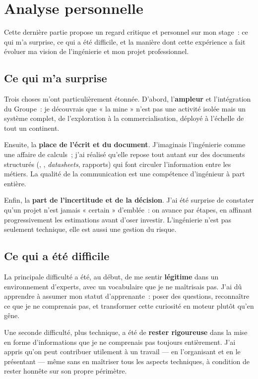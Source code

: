 \chapter{Analyse personnelle}
\label{chap:analyse}

Cette dernière partie propose un regard critique et personnel sur mon stage~: ce qui m'a surprise, ce qui a été difficile, et la manière dont cette expérience a fait évoluer ma vision de l'ingénierie et mon projet professionnel.

\section{Ce qui m'a surprise}

Trois choses m'ont particulièrement étonnée. D'abord, l'\textbf{ampleur} et l'intégration du Groupe~: je découvrais que « la mine » n'est pas une activité isolée mais un système complet, de l'exploration à la commercialisation, déployé à l'échelle de tout un continent.

Ensuite, la \textbf{place de l'écrit et du document}. J'imaginais l'ingénierie comme une affaire de calculs~; j'ai réalisé qu'elle repose tout autant sur des documents structurés (, , \textit{datasheets}, rapports) qui font circuler l'information entre les métiers. La qualité de la communication est une compétence d'ingénieur à part entière.

Enfin, la \textbf{part de l'incertitude et de la décision}. J'ai été surprise de constater qu'un projet n'est jamais « certain » d'emblée~: on avance par étapes, en affinant progressivement les estimations avant d'oser investir. L'ingénierie n'est pas seulement technique, elle est aussi une gestion du risque.

\section{Ce qui a été difficile}

La principale difficulté a été, au début, de me sentir \textbf{légitime} dans un environnement d'experts, avec un vocabulaire que je ne maîtrisais pas. J'ai dû apprendre à assumer mon statut d'apprenante~: poser des questions, reconnaître ce que je ne comprenais pas, et transformer cette curiosité en moteur plutôt qu'en gêne.

Une seconde difficulté, plus technique, a été de \textbf{rester rigoureuse} dans la mise en forme d'informations que je ne comprenais pas toujours entièrement. J'ai appris qu'on peut contribuer utilement à un travail --- en l'organisant et en le présentant --- même sans en maîtriser tous les aspects techniques, à condition de rester honnête sur son propre périmètre.

